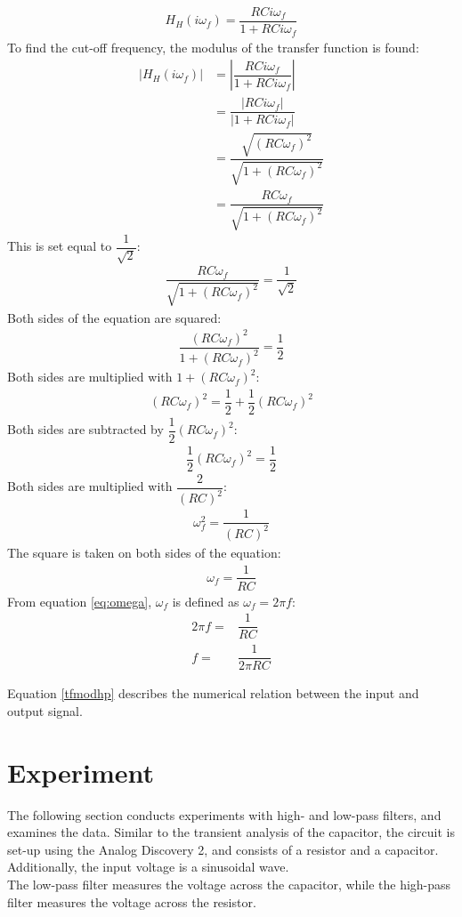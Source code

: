 \begin{align*}
H_{H}(i \omega_f) = \dfrac{RCi \omega_f}{1 + RCi \omega_f}
\end{align*}
To find the cut-off frequency, the modulus of the transfer function is found:
\begin{align}
\left|H_{H}(i \omega_f)\right| &= \left|\dfrac{RCi \omega_f}{1 + RCi \omega_f} \right| \\
 &= \dfrac{|RCi \omega_f|}{|1 + RCi \omega_f |} \\
 &= \dfrac{\sqrt{(RC \omega_f)^2}}{\sqrt{1 + (RC \omega_f)^2 }} \\
 &= \dfrac{RC \omega_f}{\sqrt{1 + (RC \omega_f)^2 }} \label{tfmodhp}
\end{align} 
This is set equal to $\dfrac{1}{\sqrt{2}}$:
\begin{align}
\dfrac{RC \omega_f}{\sqrt{1 + (RC \omega_f)^2 }}=\dfrac{1}{\sqrt{2}}
\end{align}
Both sides of the equation are squared:
\begin{align}
\dfrac{(RC \omega_f)^2}{1 + (RC \omega_f)^2 }=\dfrac{1}{2}
\end{align}
Both sides are multiplied with $1+(RC\omega_f)^2$:
\begin{align}
(RC \omega_f)^2 =\dfrac{1}{2}+\dfrac{1}{2}(RC\omega_f)^2
\end{align}
Both sides are subtracted  by $\dfrac{1}{2}(RC\omega_f)^2$:
\begin{align}
\dfrac{1}{2}(RC \omega_f)^2 =\dfrac{1}{2}
\end{align}
Both sides are multiplied with $\dfrac{2}{(RC)^2}$:
\begin{align}
\omega_f^2 =\dfrac{1}{(RC)^2}
\end{align}
The square is taken on both sides of the equation:
\begin{align}
\omega_f =\dfrac{1}{RC}
\end{align}
From equation \eqref{eq:omega}, $\omega_f$ is defined as $\omega_f=2 \pi f$:
\begin{align}
2\pi f=&\dfrac{1}{RC}
\\
f=&\dfrac{1}{2\pi RC}
\end{align}

\noindent Equation \eqref{tfmodhp} describes the numerical relation between the input and output signal.


\section{Experiment} \label{experiment}
The following section conducts experiments with high- and low-pass filters, and examines the data. Similar to the transient analysis of the capacitor, the circuit is set-up using the Analog Discovery 2, and consists of a resistor and a capacitor. Additionally, the input voltage  is a  sinusoidal wave. \\
The low-pass filter measures the voltage across the capacitor, while the high-pass filter measures the voltage across the resistor.

